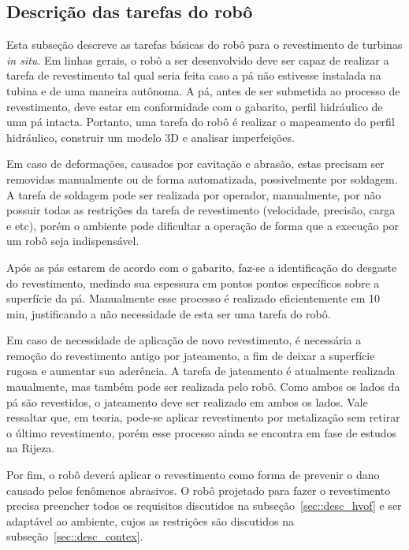 \subsection{Descrição das tarefas do robô}
\label{desc_taref}
Esta subseção descreve as tarefas básicas do robô para o revestimento de
turbinas \textit{in situ}. Em linhas gerais, o robô a ser desenvolvido deve ser
capaz de realizar a tarefa de revestimento tal qual seria feita caso a pá não estivesse instalada na
tubina e de uma maneira autônoma. A pá, antes de ser submetida ao
processo de revestimento, deve estar em conformidade com o gabarito, perfil hidráulico de uma pá
intacta. Portanto, uma tarefa do robô é realizar o mapeamento do perfil
hidráulico, construir um modelo 3D e analisar imperfeições.

Em caso de deformações, causados por cavitação e abrasão, estas precisam
ser removidas manualmente ou de forma automatizada, possivelmente por
soldagem. A tarefa de soldagem pode
ser realizada por operador, manualmente, por não possuir todas as restrições
da tarefa de revestimento (velocidade, precisão, carga e etc), porém o ambiente
pode dificultar a operação de forma que a execução por um robô seja
indispensável. 

Após as pás estarem de acordo com o gabarito, faz-se a
identificação do desgaste do revestimento, medindo sua espessura em pontos
pontos específicos sobre a superfície da pá. Manualmente esse
processo é realizado eficientemente em 10 min, justificando a não necessidade de
esta ser uma tarefa do robô. 

Em caso de necessidade de aplicação
de novo revestimento, é necessária a remoção do revestimento antigo por
jateamento, a fim de deixar a superfície rugosa e aumentar sua aderência. A
tarefa de jateamento é atualmente realizada maualmente, mas também pode ser
realizada pelo robô. Como ambos os lados da pá são revestidos, o jateamento deve
ser realizado em ambos os lados. Vale ressaltar que, em teoria, pode-se aplicar revestimento por metalização sem retirar o último revestimento,
porém esse processo ainda se encontra em fase de estudos na Rijeza.

Por fim, o robô deverá aplicar o revestimento como
forma de prevenir o dano causado pelos fenômenos abrasivos. O robô projetado
para fazer o revestimento precisa preencher todos os requisitos discutidos na
subseção~\ref{sec::desc_hvof} e ser adaptável ao ambiente, cujos as restrições
são discutidos na subseção~\ref{sec::desc_contex}. 

